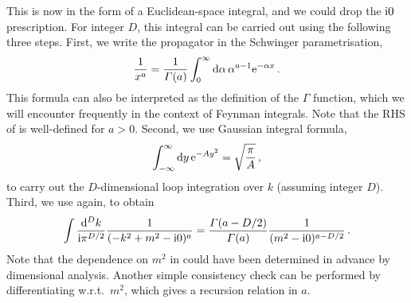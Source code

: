 This is now in the form of a Euclidean-space integral, and we could drop the $\mathrm{i} 0$ prescription.
For integer $D$, this integral can be carried out using the following three steps.
First, we write the propagator in the Schwinger parametrisation, 
\begin{align}\label{schwinger}
\frac{1}{x^a} = \frac{1}{\Gamma(a)} \int_0^{\infty} \d\alpha\, \alpha^{a-1} \mathrm{e}^{-\alpha x}\,.
\end{align}
This formula can also be interpreted as the definition of the $\Gamma$ function, which we will encounter frequently in the context of Feynman integrals.
Note that the RHS of  is well-defined for $a>0$. 
Second, we use Gaussian integral formula,
\begin{align}
\label{eq:GaussVolume}
\int_{-\infty}^{\infty} \mathrm{d} y \,\mathrm{e}^{-A y^2} = \sqrt{ \frac{{\pi}}{{A}}} \,,
\end{align}
to carry out the $D$-dimensional loop integration over $k$ (assuming integer $D$).
Third, we use  again, to obtain
\begin{align}\label{single_propagator}
 \int \frac{\d^{D}k}{\i \pi^{D/2}}  \frac{1}{(-k^2 + m^2-\i 0)^a} = \frac{\Gamma(a-D/2)}{\Gamma(a)} \frac{1}{(m^2-\i 0)^{a-D/2}} \,.
\end{align}
%
Note that the dependence on $m^2$ in  could have been determined in advance by dimensional analysis.
Another simple consistency check can be performed by differentiating w.r.t.~$m^2$, which gives a recursion relation in $a$.


